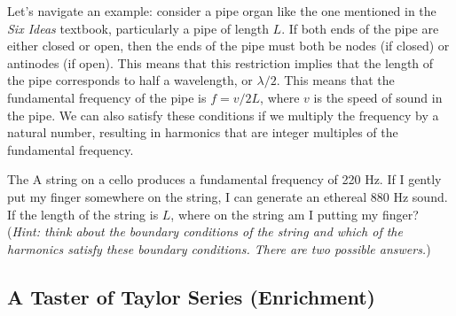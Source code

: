 \documentclass{article}
\begin{document}
\vspace{1em}

Let's navigate an example: consider a pipe organ like the one mentioned in the \textit{Six Ideas} textbook, particularly a pipe of length $L$. If both ends of the pipe are either closed or open, then the ends of the pipe must both be nodes (if closed) or antinodes (if open). This means that this restriction implies that the length of the pipe corresponds to half a wavelength, or $\lambda / 2$. This means that the fundamental frequency of the pipe is $f = v/2L$, where $v$ is the speed of sound in the pipe. We can also satisfy these conditions if we multiply the frequency by a natural number, resulting in harmonics that are integer multiples of the fundamental frequency.




\begin{tcolorbox}[colframe=blue!50!black, arc=2mm, title=\textsc{Practice 2}]
	The A string on a cello produces a fundamental frequency of 220 Hz. If I gently put my finger somewhere on the string, I can generate an ethereal 880 Hz sound. If the length of the string is $L$, where on the string am I putting my finger? (\textit{Hint: think about the boundary conditions of the string and which of the harmonics satisfy these boundary conditions. There are two possible answers.})
\end{tcolorbox}

\subsection*{A Taster of Taylor Series (Enrichment)}
\end{document}
